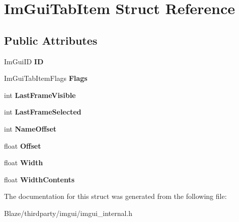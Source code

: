 \hypertarget{structImGuiTabItem}{}\section{Im\+Gui\+Tab\+Item Struct Reference}
\label{structImGuiTabItem}
\subsection*{Public Attributes}
\begin{DoxyCompactItemize}
\item 
\mbox{\label{structImGuiTabItem_aa1a225e6ac0ee4dfa815fe5c7c63fe92}} 
Im\+Gui\+ID {\bfseries ID}
\item 
\mbox{\label{structImGuiTabItem_a68c7537c57324068fbca54861eab5c95}} 
Im\+Gui\+Tab\+Item\+Flags {\bfseries Flags}
\item 
\mbox{\label{structImGuiTabItem_a5f386218e311d8c84db72316f686112a}} 
int {\bfseries Last\+Frame\+Visible}
\item 
\mbox{\label{structImGuiTabItem_ad57f644ed9813c02a9616711320535ac}} 
int {\bfseries Last\+Frame\+Selected}
\item 
\mbox{\label{structImGuiTabItem_a635a807a8154306f2b8959bca4573dba}} 
int {\bfseries Name\+Offset}
\item 
\mbox{\label{structImGuiTabItem_ac09eeb85bebba09f18ac959bc32b5cef}} 
float {\bfseries Offset}
\item 
\mbox{\label{structImGuiTabItem_a215d96577ec4396f224524eb8851ff2a}} 
float {\bfseries Width}
\item 
\mbox{\label{structImGuiTabItem_abb7421d21cb0343887cc8536c34e12a4}} 
float {\bfseries Width\+Contents}
\end{DoxyCompactItemize}


The documentation for this struct was generated from the following file\+:\begin{DoxyCompactItemize}
\item 
Blaze/thirdparty/imgui/imgui\+\_\+internal.\+h\end{DoxyCompactItemize}
